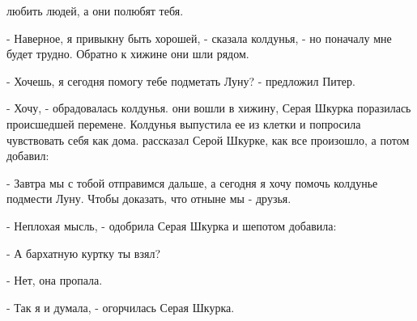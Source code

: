 любить людей, а они полюбят тебя.
\par- Наверное, я привыкну быть хорошей, - сказала колдунья, - но 
поначалу мне будет трудно. Обратно к хижине они шли рядом.
\par- Хочешь, я сегодня помогу тебе подметать Луну? - предложил Питер.
\par- Хочу, - обрадовалась колдунья.
 они вошли в хижину, Серая Шкурка поразилась происшедшей 
перемене. Колдунья выпустила ее из клетки и попросила чувствовать себя 
как дома.
 рассказал Серой Шкурке, как все произошло, а потом добавил:
\par- Завтра мы с тобой отправимся дальше, а сегодня я хочу помочь 
колдунье подмести Луну. Чтобы доказать, что отныне мы - друзья.
\par- Неплохая мысль, - одобрила Серая Шкурка и шепотом добавила:
\par- А бархатную куртку ты взял?
\par- Нет, она пропала.
\par- Так я и думала, - огорчилась Серая Шкурка.
